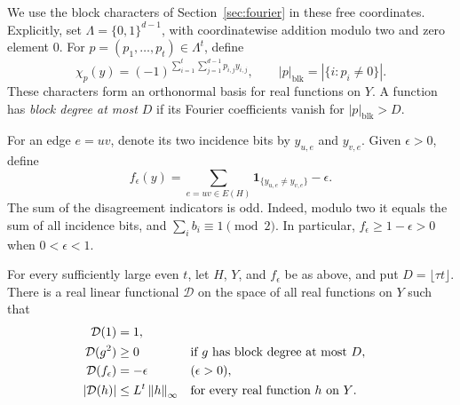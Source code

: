 We use the block characters of Section~\ref{sec:fourier} in these free
coordinates.  Explicitly, set \(\Lambda=\{0,1\}^{d-1}\), with
coordinatewise addition modulo two and zero element \(0\).  For
\(p=(p_1,\ldots,p_t)\in\Lambda^t\), define
\[
  \chi_p(y)=(-1)^{\sum_{i=1}^t\sum_{j=1}^{d-1}p_{i,j}y_{i,j}},
  \qquad |p|_{\mathrm{blk}}=|\{i:p_i\ne0\}|.
\]
These characters form an orthonormal basis for real functions on \(Y\).
A function has \emph{block degree at most \(D\)} if its Fourier
coefficients vanish for \(|p|_{\mathrm{blk}}>D\).

For an edge \(e=uv\), denote its two incidence bits by \(y_{u,e}\) and
\(y_{v,e}\).  Given \(\epsilon>0\), define
\begin{equation}
  f_\epsilon(y)=
    \sum_{e=uv\in E(H)}\mathbf1_{\{y_{u,e}\ne y_{v,e}\}}-\epsilon.
  \label{eq:parity-function}
\end{equation}
The sum of the disagreement indicators is odd.  Indeed, modulo two it
equals the sum of all incidence bits, and
\(\sum_i b_i\equiv1\pmod2\).
In particular, \(f_\epsilon\geq1-\epsilon>0\) when \(0<\epsilon<1\).

\begin{proposition}
  \label{prop:parity-functional}
  For every sufficiently large even \(t\), let \(H\), \(Y\), and
  \(f_\epsilon\) be as above, and put \(D=\lfloor\tau t\rfloor\).
  There is a real linear functional \(\mathcal D\) on the space of all
  real functions on \(Y\) such that
  \begin{align}
    \mathcal D(1)&=1,
      \label{eq:parity-functional-one}\\
    \mathcal D(g^2)&\geq0
      &&\text{if \(g\) has block degree at most \(D\)},
      \label{eq:parity-functional-positivity}\\
    \mathcal D(f_\epsilon)&=-\epsilon
      &&(\epsilon>0),
      \label{eq:parity-functional-value}\\
    |\mathcal D(h)|&\leq L^t\left\lVert h\right\rVert_\infty
      &&\text{for every real function \(h\) on \(Y\)}.
      \label{eq:parity-functional-norm}
  \end{align}
\end{proposition}

